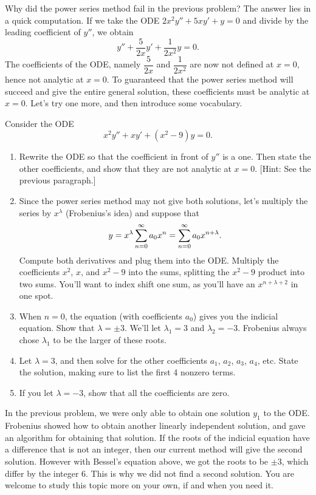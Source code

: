 Why did the power series method fail in the previous problem?  The answer lies in a quick computation.  If we take the ODE 
$2x^2y''+5xy'+y=0$
and divide by the leading coefficient of $y''$, we obtain 
$$y''+\frac{5}{2x}y'+\frac{1}{2x^2}y=0.$$
The coefficients of the ODE, namely $\dfrac{5}{2x}$ and $\dfrac{1}{2x^2}$ are now not defined at $x=0$, hence not analytic at $x=0$.  To guaranteed that the power series method will succeed and give the entire general solution, these coefficients must be analytic at $x=0$.  Let's try one more, and then introduce some vocabulary.   

\begin{problem}
 Consider the ODE  $$x^2y''+xy'+(x^2-9)y=0.$$
\begin{enumerate}
 \item Rewrite the ODE so that the coefficient in front of $y''$ is a one.  Then state the other coefficients, and show that they are not analytic at $x=0$. [Hint: See the previous paragraph.]
 \item Since the power series method may not give both solutions, let's multiply the series by $x^\lambda$ (Frobenius's idea) and suppose that $$\displaystyle y=x^\lambda \sum_{n=0}^\infty a_0 x^n = \sum_{n=0}^\infty a_0 x^{n+\lambda}.$$ Compute both derivatives and plug them into the ODE. Multiply the coefficients $x^2$, $x$, and $x^2-9$ into the sums, splitting the $x^2-9$ product into two sums. You'll want to index shift one sum, as you'll have an $x^{n+\lambda+2}$ in one spot.
 \item When $n=0$, the equation (with coefficients $a_0$) gives you the indicial equation. Show that $\lambda = \pm 3$. We'll let $\lambda_1=3$ and $\lambda_2=-3$.  Frobenius always chose $\lambda_1$ to be the larger of these roots.
 \item Let $\lambda =3$, and then solve for the other coefficients $a_1$, $a_2$, $a_3$, $a_4$, etc. State the solution, making sure to list the first 4 nonzero terms. 
 \item If you let $\lambda = -3$, show that all the coefficients are zero. 
\end{enumerate}

\end{problem}

In the previous problem, we were only able to obtain one solution $y_1$ to the ODE. Frobenius showed how to obtain another linearly independent solution, and gave an algorithm for obtaining that solution.  If the roots of the indicial equation have a difference that is not an integer, then our current method will give the second solution. However with Bessel's equation above, we got the roots to be $\pm 3$, which differ by the integer 6.  This is why we did not find a second solution. You are welcome to study this topic more on your own, if and when you need it. 

